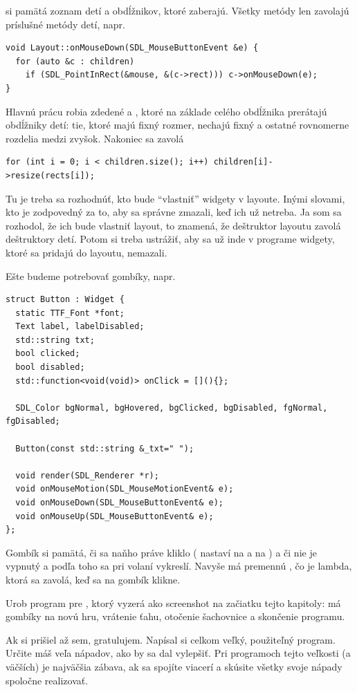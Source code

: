  si pamätá zoznam detí a obdĺžnikov, ktoré zaberajú. Všetky metódy 
len zavolajú príslušné metódy detí, napr.

\begin{lstlisting}
void Layout::onMouseDown(SDL_MouseButtonEvent &e) {
  for (auto &c : children)
    if (SDL_PointInRect(&mouse, &(c->rect))) c->onMouseDown(e);
}
\end{lstlisting}

Hlavnú prácu robia zdedené   a , ktoré
na základe celého obdĺžnika prerátajú obdĺžniky detí: tie, ktoré majú fixný rozmer, nechajú fixný
a ostatné rovnomerne rozdelia medzi zvyšok. Nakoniec sa zavolá

\begin{lstlisting}
for (int i = 0; i < children.size(); i++) children[i]->resize(rects[i]);
\end{lstlisting}

Tu je treba sa rozhodnúť, kto bude ``vlastniť'' widgety v layoute. Inými slovami, kto je
zodpovedný za to, aby sa správne zmazali, keď ich už netreba. Ja som sa rozhodol, že 
ich bude vlastniť layout, to znamená, že deštruktor layoutu zavolá deštruktory detí. 
Potom si treba ustrážiť, aby sa už inde v programe widgety, ktoré sa pridajú do layoutu,
nemazali.

Ešte budeme potrebovať gombíky, napr.

\begin{lstlisting}
struct Button : Widget {
  static TTF_Font *font;
  Text label, labelDisabled;
  std::string txt;
  bool clicked;
  bool disabled;
  std::function<void(void)> onClick = [](){};

  SDL_Color bgNormal, bgHovered, bgClicked, bgDisabled, fgNormal, fgDisabled;

  Button(const std::string &_txt=" ");

  void render(SDL_Renderer *r);
  void onMouseMotion(SDL_MouseMotionEvent& e);
  void onMouseDown(SDL_MouseButtonEvent& e);
  void onMouseUp(SDL_MouseButtonEvent& e);
};
\end{lstlisting}

Gombík si pamätá, či sa naňho práve kliklo ( nastaví  na 
a  na ) a či nie je vypnutý a podľa toho sa pri volaní 
vykreslí. Navyše má premennú , čo je lambda, ktorá sa zavolá, keď sa
na gombík klikne.

\begin{uloha}
  Urob program pre \btr, ktorý vyzerá ako screenshot na začiatku tejto kapitoly:
  má gombíky na novú hru, vrátenie ťahu, otočenie šachovnice a skončenie programu.
\end{uloha}

Ak si prišiel až sem, gratulujem. Napísal si celkom veľký, použiteľný program. Určite máš veľa
nápadov, ako by sa dal vylepšiť. Pri programoch tejto veľkosti (a väčších)
je najväčšia zábava, ak sa spojíte viacerí a skúsite všetky svoje nápady spoločne realizovať.

